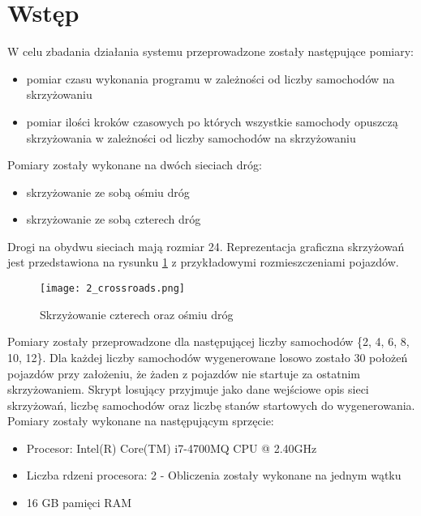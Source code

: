  \label{chap:outcomes}

\section{Wstęp}

W celu zbadania działania systemu przeprowadzone zostały następujące pomiary:
\begin{itemize}
\item pomiar czasu wykonania programu w zależności od liczby samochodów na skrzyżowaniu 
\item pomiar ilości kroków czasowych po których wszystkie samochody opuszczą skrzyżowania w zależności od liczby samochodów na skrzyżowaniu
\end{itemize}

Pomiary zostały wykonane na dwóch sieciach dróg:
\begin{itemize}
\item skrzyżowanie ze sobą ośmiu dróg
\item skrzyżowanie ze sobą czterech dróg
\end{itemize}

Drogi na obydwu sieciach mają rozmiar 24. Reprezentacja graficzna skrzyżowań jest przedstawiona na rysunku \ref{both-crossroads} z przykładowymi rozmieszczeniami pojazdów.
\begin{figure}[H]
    \texttt{[image: 2\_crossroads.png]}
  \caption{Skrzyżowanie czterech oraz ośmiu dróg}
  \label{both-crossroads}
\end{figure}

Pomiary zostały przeprowadzone dla następującej liczby samochodów \{2, 4, 6, 8, 10, 12\}. Dla każdej liczby samochodów wygenerowane losowo zostało 30 położeń pojazdów przy założeniu, że żaden z pojazdów nie startuje za ostatnim skrzyżowaniem. Skrypt losujący przyjmuje jako dane wejściowe opis sieci skrzyżowań, liczbę samochodów oraz liczbę stanów startowych do wygenerowania.
\newline
\newline
Pomiary zostały wykonane na następującym sprzęcie:
\begin{itemize}
\item Procesor: Intel(R) Core(TM) i7-4700MQ CPU @ 2.40GHz
\item Liczba rdzeni procesora: 2 - Obliczenia zostały wykonane na jednym wątku
\item 16 GB pamięci RAM
\end{itemize}

